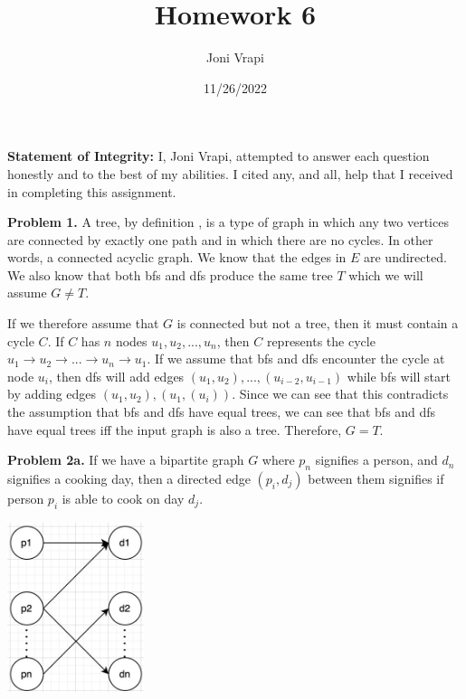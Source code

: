 \documentclass{article}
\title{Homework 6}
\author{Joni Vrapi}
\date{11/26/2022}
\begin{document}
\maketitle

\textbf{Statement of Integrity:} I, Joni Vrapi, attempted to answer each question honestly and to the best of my abilities. I cited any, and all, help that I received in completing this assignment.

\hfill

\textbf{Problem 1.} A tree, by definition \cite{website:1}, is a type of graph in which any two vertices are connected by exactly one path and in which there are no cycles. In other words, a connected acyclic graph. We know that the edges in $E$ are undirected. We also know that both bfs and dfs produce the same tree $T$ which we will assume $G \neq T$. 

If we therefore assume that $G$ is connected but not a tree, then it must contain a cycle $C$. If $C$ has $n$ nodes $u_1, u_2, ... , u_n$, then $C$ represents the cycle $u_1 \rightarrow u_2 \rightarrow ... \rightarrow u_n \rightarrow u_1$. If we assume that bfs and dfs encounter the cycle at node $u_i$, then dfs will add edges $(u_1, u_2), ... , (u_{i-2}, u_{i-1})$ while bfs will start by adding edges $(u_1, u_2), (u_1, (u_i))$. Since we can see that this contradicts the assumption that bfs and dfs have equal trees, we can see that bfs and dfs have equal trees iff the input graph is also a tree. Therefore, $G = T$.

\hfill

\textbf{Problem 2a.} If we have a bipartite graph $G$ where $p_n$ signifies a person, and $d_n$ signifies a cooking day, then a directed edge $(p_i, d_j)$ between them signifies if person $p_i$ is able to cook on day $d_j$. 

\begin{center}
    \includegraphics[width=4cm, height=5cm]{images/bipartite-graph.jpg}
\end{center}
\end{document}
